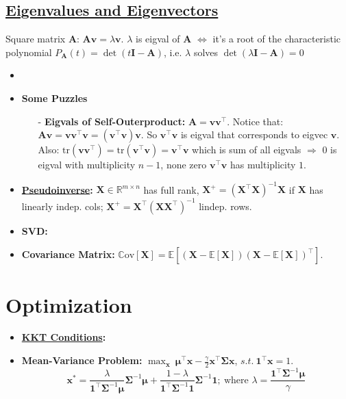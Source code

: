 \documentclass[9pt, landscape]{article}
\begin{document}
\begin{multicols*}{3}
\subsection{\href{https://en.wikipedia.org/wiki/Eigenvalues_and_eigenvectors}{Eigenvalues and Eigenvectors}}
Square matrix $\bm{A}$: $\bm{Av} = \lambda \bm{v}$. $\lambda$ is eigval of $\bm{A}$ $\iff$ it's a root of the characteristic polynomial $P_{\bm{A}}(t) = \det( t \bm{I} - \bm{A})$, i.e. $\lambda$ solves $\det(\lambda \bm{I} - \bm{A}) = 0$
\begin{itemize}
	\item 
	\item \textbf{Some Puzzles}
	\begin{itemize}[leftmargin=10pt,noitemsep,topsep=0pt,partopsep=0pt]
		\item[-] \textbf{Eigvals of Self-Outerproduct:} $\bm{A} = \bm{v}\bm{v}^{\top}$. Notice that: $\bm{Av} = \bm{v}\bm{v}^{\top} \bm{v} = (\bm{v}^{\top} \bm{v}) \bm{v}$. So $\bm{v}^{\top} \bm{v}$ is eigval that corresponds to eigvec $\bm{v}$. Also: $\text{tr}(\bm{v}\bm{v}^{\top}) = \text{tr}(\bm{v}^{\top} \bm{v}) = \bm{v}^{\top} \bm{v}$ which is sum of all eigvals $\Rightarrow$ $0$ is eigval with multiplicity $n-1$, none zero $\bm{v}^{\top} \bm{v}$ has multiplicity $1$.
	\end{itemize}
\end{itemize}
\begin{itemize}
	\item \textbf{\href{https://en.wikipedia.org/wiki/Moore-Penrose_inverse}{Pseudoinverse}:} $\bm{X}\in \mathbb{R}^{m\times n}$ has full rank, $\bm{X}^{+} = (\bm{X}^{\top} \bm{X})^{-1} \bm{X}$ if $\bm{X}$ has linearly indep. cols; $\bm{X}^{+} = \bm{X}^{\top} (\bm{X}\bm{X}^{\top})^{-1}$ lindep. rows.
	\item \textbf{SVD:}
	\item \textbf{Covariance Matrix:} $\mathrm{\mathbb{C}ov}\left[\bm{X}\right] = \mathbb{E}\left[(\bm{X}- \mathbb{E}\left[\bm{X}\right])(\bm{X}- \mathbb{E}\left[\bm{X}\right])^{\top}\right]$.
\end{itemize}

\section{Optimization}
\begin{itemize}
	\item \textbf{\href{https://www.zhihu.com/question/23311674/answer/235256926}{KKT Conditions}:} 
	\item \textbf{Mean-Variance Problem:} $\max_{\bm{x}}~\bm{\mu}^{\top} \bm{x} - \frac{\gamma}{2} \bm{x}^{\top} \bm{\Sigma} \bm{x}$, $s.t.~\bm{1}^{\top} \bm{x} = 1$. 
	$$
	\bm{x}^* =  \frac{\lambda}{\bm{1}^{\top} \bm{\Sigma}^{-1} \bm{\mu}} \bm{\Sigma}^{-1} \bm{\mu} + \frac{1- \lambda}{\bm{1}^{\top} \bm{\Sigma}^{-1} \bm{1}} \bm{\Sigma}^{-1} \bm{1};~\text{where }\lambda=\frac{\bm{1}^{\top} \bm{\Sigma}^{-1}\bm{\mu}}{\gamma}
	$$
\end{itemize}



\end{multicols*}
\end{document}
